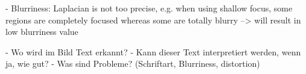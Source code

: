 - Blurriness: Laplacian is not too precise, e.g. when using shallow focus, some regions are completely focused whereas some are totally blurry
--> will result in low blurriness value


- Wo wird im Bild Text erkannt?
- Kann dieser Text interpretiert werden, wenn ja, wie gut?
- Was sind Probleme? (Schriftart, Blurriness, distortion)



